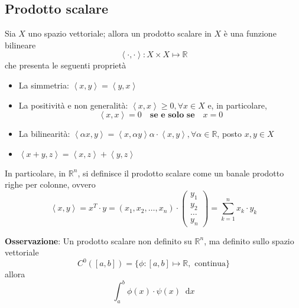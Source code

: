 \documentclass[a4paper]{extarticle}
\newcommand*\dif{\mathop{}\!\mathrm{d}}
\begin{document}
\subsection{Prodotto scalare}
Sia $X$ uno spazio vettoriale; allora un prodotto scalare in $X$ è una funzione bilineare
\[\left< \cdot, \cdot \right> : X \times X \longmapsto \mathbb{R}\]
che presenta le seguenti proprietà
\begin{itemize}
    \item La simmetria: $\left<x,y\right>=\left<y,x\right>$
    \item La positività e non generalità: $\left<x,x\right>\geq 0, \forall x \in X$ e, in particolare,
    \[\left<x,x\right>=0 \hspace{1em} \textbf{se e solo se} \hspace{1em} x=0\]
    \item La bilinearità: $\left<\alpha x, y \right> = \left< x, \alpha y \right>\alpha \cdot \left<x,y\right>, \forall \alpha \in \mathbb{R}$, posto $x, y \in X$
    \item $\left<x+y,z\right>=\left<x,z\right>+\left<y,z\right>$
\end{itemize}
In particolare, in $\mathbb{R}^n$, si definisce il prodotto scalare come un banale prodotto righe per colonne, ovvero
\[\left<x,y\right> = x{^T} \cdot y = \left(x_1,x_2,\dots,x_n\right) \cdot \left(
    \begin{array}{c}
        y_1\\
        y_2\\
        \dots\\
        y_n
    \end{array}
\right) = \sum_{k=1}^n x_k \cdot y_k\]

\vspace{1em}
\noindent
\textbf{Osservazione}: Un prodotto scalare non definito su $\mathbb{R}^n$, ma definito sullo spazio vettoriale
\[C^0 \left(\left[a,b\right]\right) = \{\phi : [a,b] \longmapsto \mathbb{R}, \text{ continua}\}\]
allora
\[\int_a^b \phi(x) \cdot \psi(x) \dif x\]

\vspace{1em}
\end{document}

